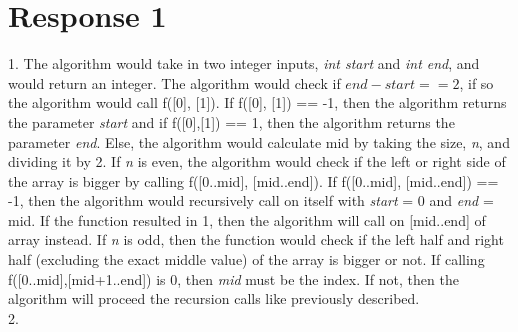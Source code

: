 \documentclass[12pt, a4paper]{article}
\begin{document}
\maketitle
\section*{\centering Response 1}
    1. The algorithm would take in two integer inputs, \textit{int start} and \textit{int end}, and would return an integer.
    The algorithm would check if \(end - start == 2\), if so the algorithm would call f([0], [1]).
    If f([0], [1]) == -1, then the algorithm returns the parameter \textit{start} and if f([0],[1]) == 1, then the algorithm returns the parameter \textit{end}.
    Else, the algorithm would calculate mid by taking the size, \textit{n}, and dividing it by 2. 
    If \textit{n} is even, the algorithm would check if the left or right side of the array is bigger by calling f([0..mid], [mid..end]).
    If f([0..mid], [mid..end]) == -1, then the algorithm would recursively call on itself with \textit{start} = 0 and \textit{end} = mid.
    If the function resulted in 1, then the algorithm will call on [mid..end] of array instead.
    If \textit{n} is odd, then the function would check if the left half and right half (excluding the exact middle value) of the array is bigger or not.
    If calling f([0..mid],[mid+1..end]) is 0, then \textit{mid} must be the index. If not, then the algorithm will proceed the recursion calls like previously described.\\
    2. 
\end{document}
